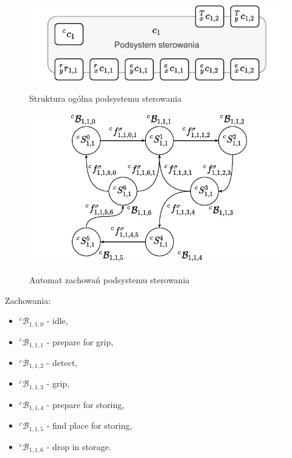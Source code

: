\begin{figure}
    \centering
    \includegraphics[width=\columnwidth]{figures/ISR-cs-model.pdf}
    \label{fig:model-cs}
    \caption{Struktura ogólna podsystemu sterowania}
\end{figure}

\begin{figure}
    \centering
    \includegraphics[width=\columnwidth]{figures/ISR-cs-behaviours.pdf}
    \label{fig:zachowania-ve-manip}
    \caption{Automat zachowań podsystemu sterowania}
\end{figure}

Zachowania:
\begin{itemize}
    \item ${}^{c}\mathcal{B}_{1,1,0}$ - idle,
    \item ${}^{c}\mathcal{B}_{1,1,1}$ - prepare for grip,
    \item ${}^{c}\mathcal{B}_{1,1,2}$ - detect,
    \item ${}^{c}\mathcal{B}_{1,1,3}$ - grip,
    \item ${}^{c}\mathcal{B}_{1,1,4}$ - prepare for storing,
    \item ${}^{c}\mathcal{B}_{1,1,5}$ - find place for storing,
    \item ${}^{c}\mathcal{B}_{1,1,6}$ - drop in storage.
\end{itemize}